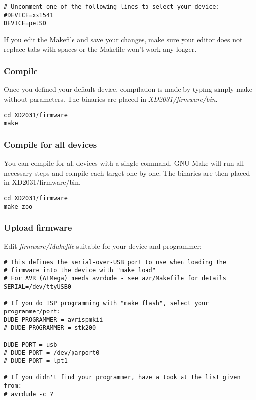 \begin{verbatim}
# Uncomment one of the following lines to select your device:
#DEVICE=xs1541
DEVICE=petSD
\end{verbatim}

If you edit the Makefile and save your changes, make sure your editor does 
not replace tabs with spaces or the Makefile won't work any longer.

\subsubsection{Compile}

Once you defined your default device, compilation is made by typing simply make without parameters. The binaries are placed in \textit{XD2031/firmware/bin}.

\begin{verbatim}
cd XD2031/firmware
make
\end{verbatim}

\subsubsection{Compile for all devices}
You can compile for all devices with a single command. 
GNU Make will run all necessary steps and compile each target one by one. The binaries are then placed in XD2031/firmware/bin.

\begin{verbatim}
cd XD2031/firmware
make zoo
\end{verbatim}

\subsubsection{Upload firmware}
Edit \textit{firmware/Makefile} suitable for your device and programmer:

\begin{verbatim}
# This defines the serial-over-USB port to use when loading the
# firmware into the device with "make load"
# For AVR (AtMega) needs avrdude - see avr/Makefile for details
SERIAL=/dev/ttyUSB0

# If you do ISP programming with "make flash", select your programmer/port:
DUDE_PROGRAMMER = avrispmkii
# DUDE_PROGRAMMER = stk200

DUDE_PORT = usb
# DUDE_PORT = /dev/parport0
# DUDE_PORT = lpt1

# If you didn't find your programmer, have a took at the list given from:
# avrdude -c ?
\end{verbatim}


